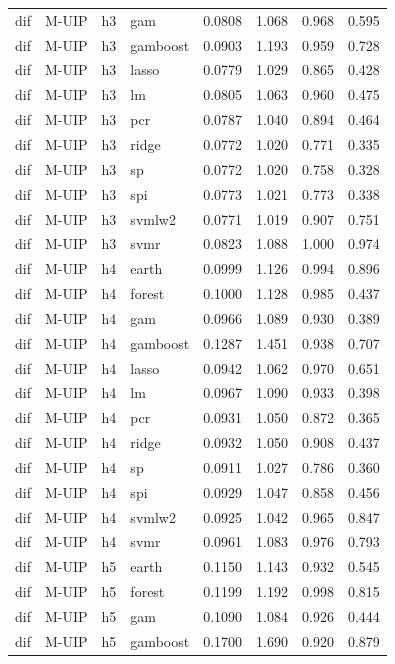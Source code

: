 \begin{ThreePartTable}
\begin{longtable}[t]{llclcccc}
dif & M-UIP & h3 & gam & 0.0808 & 1.068 & 0.968 & 0.595\\
dif & M-UIP & h3 & gamboost & 0.0903 & 1.193 & 0.959 & 0.728\\
dif & M-UIP & h3 & lasso & 0.0779 & 1.029 & 0.865 & 0.428\\
dif & M-UIP & h3 & lm & 0.0805 & 1.063 & 0.960 & 0.475\\
dif & M-UIP & h3 & pcr & 0.0787 & 1.040 & 0.894 & 0.464\\
dif & M-UIP & h3 & ridge & 0.0772 & 1.020 & 0.771 & 0.335\\
dif & M-UIP & h3 & sp & 0.0772 & 1.020 & 0.758 & 0.328\\
dif & M-UIP & h3 & spi & 0.0773 & 1.021 & 0.773 & 0.338\\
dif & M-UIP & h3 & svmlw2 & 0.0771 & 1.019 & 0.907 & 0.751\\
dif & M-UIP & h3 & svmr & 0.0823 & 1.088 & 1.000 & 0.974\\
\addlinespace
dif & M-UIP & h4 & earth & 0.0999 & 1.126 & 0.994 & 0.896\\
dif & M-UIP & h4 & forest & 0.1000 & 1.128 & 0.985 & 0.437\\
dif & M-UIP & h4 & gam & 0.0966 & 1.089 & 0.930 & 0.389\\
dif & M-UIP & h4 & gamboost & 0.1287 & 1.451 & 0.938 & 0.707\\
dif & M-UIP & h4 & lasso & 0.0942 & 1.062 & 0.970 & 0.651\\
dif & M-UIP & h4 & lm & 0.0967 & 1.090 & 0.933 & 0.398\\
dif & M-UIP & h4 & pcr & 0.0931 & 1.050 & 0.872 & 0.365\\
dif & M-UIP & h4 & ridge & 0.0932 & 1.050 & 0.908 & 0.437\\
dif & M-UIP & h4 & sp & 0.0911 & 1.027 & 0.786 & 0.360\\
dif & M-UIP & h4 & spi & 0.0929 & 1.047 & 0.858 & 0.456\\
dif & M-UIP & h4 & svmlw2 & 0.0925 & 1.042 & 0.965 & 0.847\\
dif & M-UIP & h4 & svmr & 0.0961 & 1.083 & 0.976 & 0.793\\
\addlinespace
dif & M-UIP & h5 & earth & 0.1150 & 1.143 & 0.932 & 0.545\\
dif & M-UIP & h5 & forest & 0.1199 & 1.192 & 0.998 & 0.815\\
dif & M-UIP & h5 & gam & 0.1090 & 1.084 & 0.926 & 0.444\\
dif & M-UIP & h5 & gamboost & 0.1700 & 1.690 & 0.920 & 0.879\\

\end{longtable}
\end{ThreePartTable}
